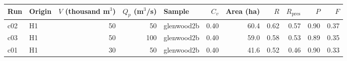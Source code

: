 \begin{tabular}{llrrlrrrrrr}\toprule
Run & Origin & $V$ (thousand m$^3$) & $Q_p$ (m$^3$/s) & Sample & $C_v$ & Area (ha) & $R$ & $R_\mathrm{pres}$ & $P$ & $F$\\\midrule
c02 & H1 & 50 & 50 & glenwood2b & 0.40 & 60.4 & 0.62 & 0.57 & 0.90 & 0.37\\
c03 & H1 & 50 & 100 & glenwood2b & 0.40 & 59.0 & 0.58 & 0.53 & 0.89 & 0.35\\
c01 & H1 & 30 & 50 & glenwood2b & 0.40 & 41.6 & 0.52 & 0.46 & 0.90 & 0.33\\
\bottomrule\end{tabular}
